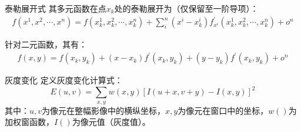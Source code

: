         \begin{theorem}{泰勒展开式}
            其多元函数在点$x_k$处的泰勒展开为（仅保留至一阶导项）：
            \begin{equation}
                \begin{aligned}
                    f(x^1,x^2, \cdots , x^n)=f(x_k^1,x_k^2, \cdots , x_k^n)+\sum_i^n (x^i-x_k^i)f^{'}_{x^i}(x_k^1,x_k^2, \cdots , x_k^n)+o^n
                \end{aligned}
            \end{equation}

            针对二元函数，其有：
            \begin{equation}
                \begin{aligned}
                    \label{taylor}
                    f(x,y)=f(x_k,y_k)+(x-x_k)f^{'}(x_k,y_k)+(y-y_k)f^{'}(x_k,y_k)+o^n
                \end{aligned}
            \end{equation}
            
        \end{theorem}

        \begin{theorem}{灰度变化}{}
            定义灰度变化计算式：
            \begin{equation}
                \label{calIvalue}
                E(u,v)=\sum_{x,y} w(x,y)[I(u+x,v+y)-I(x,y)]^2
            \end{equation}
            其中：$u,v$为像元在整幅影像中的横纵坐标，$x,y$为像元在窗口中的坐标，$w()$为加权窗函数，$I()$为像元值（灰度值）。
        \end{theorem}

